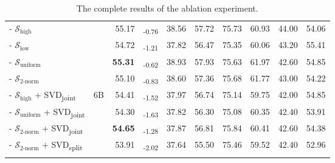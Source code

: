 \begin{table*}[t]
\begin{tabular}{lcr@{\hspace{2pt}}lcccccc}
  - $\mathcal{S}_{\text{high}}$ &   & 55.17&\textsubscript{-0.76} & 38.56 & 57.72 & 75.73 & 60.93 & 44.00 & 54.06 \\
  - $\mathcal{S}_{\text{low}}$ &   & 54.72&\textsubscript{-1.21} & 37.82 & 56.47 & 75.35 & 60.06 & 43.20 & 55.41 \\
  - $\mathcal{S}_{\text{uniform}}$ &   & \bf 55.31&\textsubscript{-0.62} & 38.93 & 57.93 & 75.63 & 61.97 & 42.60 & 54.85 \\
  - $\mathcal{S}_{\text{2-norm}}$ &   & 55.10&\textsubscript{-0.83} & 38.60 & 57.36 & 75.68 & 61.77 & 43.00 & 54.22 \\
  \arrayrulecolor{gray!20}
  \hline
  - $\mathcal{S}_{\text{high}}$ + SVD\textsubscript{joint} & \multirow{4}{*}{6B}  & 54.41&\textsubscript{-1.52} & 37.97 & 56.74 & 75.14 & 59.75 & 42.00 & 54.85 \\
  - $\mathcal{S}_{\text{uniform}}$ + SVD\textsubscript{joint} &   & 54.30&\textsubscript{-1.63} & 37.82 & 56.30 & 75.08 & 60.35 & 42.40 & 53.91 \\
  - $\mathcal{S}_{\text{2-norm}}$ + SVD\textsubscript{joint} &   & \bf 54.65&\textsubscript{-1.28} & 37.87 & 56.81 & 75.84 & 60.41 & 42.60 & 54.38 \\
  - $\mathcal{S}_{\text{2-norm}}$ + SVD\textsubscript{split} &   & 53.91  & \textsubscript{-2.02} & 37.64 & 55.50 & 75.46 & 59.52 & 42.40 & 52.96 \\
  \arrayrulecolor{black}
  \bottomrule
\end{tabular}
\caption{The complete results of the ablation experiment.}
\vspace{-0.4cm}
\label{tab:partial_rope_full}
\end{table*}